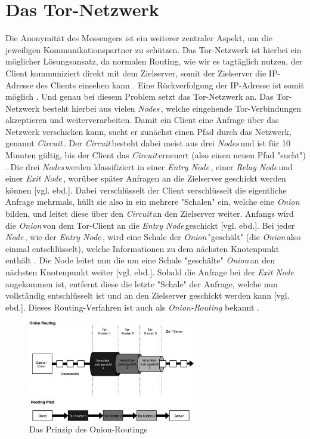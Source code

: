 \documentclass[a4paper,ngerman, headheight=28pt,12pt]{scrartcl}
\newcommand{\vcite}[1]{\cite[vgl.][]{#1}}
\newcommand{\vebd}{[vgl. ebd.]}
\newcommand{\entryn}{\textit{Entry Node\,}}
\newcommand{\relayn}{\textit{Relay Node\,}}
\newcommand{\exitn}{\textit{Exit Node\,}}
\newcommand{\nodes}{\textit{Nodes\,}}
\newcommand{\node}{\textit{Node\,}}
\newcommand{\onion}{\textit{Onion\,}}
\newcommand{\circuit}{\textit{Circuit\,}}
\begin{document}
\section{Das Tor-Netzwerk}
Die Anonymität des Messengers ist ein weiterer zentraler Aspekt, um die jeweiligen Kommunikationspartner zu schützen. Das Tor-Netzwerk ist hierbei ein möglicher Lösungsansatz, da normalen Routing, wie wir es tagtäglich nutzen, der Client kommuniziert  direkt mit dem Zielserver, somit der Zielserver die IP-Adresse des Clients einsehen kann \vcite{TCP_IP}.
Eine Rückverfolgung der IP-Adresse ist somit möglich \vcite{LocPolice}. Und genau bei diesem Problem setzt das Tor-Netzwerk an. Das Tor-Netzwerk besteht hierbei aus vielen \nodes, welche eingehende Tor-Verbindungen akzeptieren und weiterverarbeiten. Damit ein Client eine Anfrage über das Netzwerk verschicken kann, sucht er zunächst einen Pfad durch das Netzwerk, genannt \circuit \vcite{TorCircuits}. Der \circuit besteht dabei meist aus drei \nodes und ist für 10 Minuten gültig, bis der Client das \circuit erneuert (also einen neuen Pfad "sucht")  \vcite{FAQCircuitLifetime}. Die drei \nodes werden klassifiziert in einer \entryn, einer \relayn und einer \exitn, worüber später Anfragen an die Zielserver geschickt werden können \vebd.
Dabei verschlüsselt der Client verschlüsselt die eigentliche Anfrage mehrmals, hüllt sie also in ein mehrere "Schalen" ein, welche eine \onion bilden, und leitet diese über den \circuit an den Zielserver weiter\vcite{TorDesign}. Anfangs wird die \onion von dem Tor-Client an die \entryn geschickt \vebd. Bei jeder \node, wie der \entryn, wird eine Schale der \onion "geschält" (die \onion also einmal entschlüsselt), welche Informationen zu dem nächsten Knotenpunkt enthält \vcite{TorStructure2}. Die Node leitet nun die um eine Schale "geschälte" \onion an den nächsten Knotenpunkt weiter \vebd.
Sobald die Anfrage bei der \exitn angekommen ist, entfernt diese die letzte "Schale" der Anfrage, welche nun vollständig entschlüsselt ist und an den Zielserver geschickt werden kann \vebd. Dieses Routing-Verfahren ist auch als \textit{Onion-Routing} bekannt \vcite{TorDesign}.

\begin{figure}[h]
  \centering
  \includegraphics[width=0.65\textwidth]{TorRoutingSimple.png}
  \caption{Das Prinzip des Onion-Routings \vcite{fig:Tor-Structure} \label{fig:TorStructure}}
\end{figure}
\end{document}
